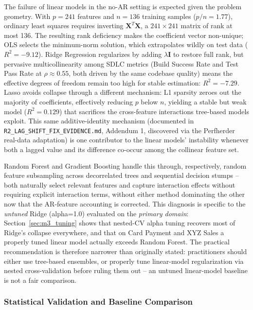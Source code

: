 \documentclass[technologies,article,submit,pdftex,moreauthors]{Definitions/mdpi}
\begin{document}
The failure of linear models in the no-AR setting is expected given the
problem geometry. With \(p = 241\) features and \(n = 136\) training
samples (\(p/n = 1.77\)), ordinary least squares requires inverting
\(\mathbf{X}^T\mathbf{X}\), a \(241 \times 241\) matrix of rank at most
136. The resulting rank deficiency makes the coefficient vector
non-unique; OLS selects the minimum-norm solution, which extrapolates
wildly on test data (\(R^2 = -9.12\)). Ridge Regression regularizes by
adding \(\lambda \mathbf{I}\) to restore full rank, but pervasive
multicollinearity among SDLC metrics (Build Success Rate and Test Pass
Rate at \(\rho \approx 0.55\), both driven by the same codebase quality)
means the effective degrees of freedom remain too high for stable
estimation: \(R^2 = -7.29\). Lasso avoids collapse through a different
mechanism: L1 sparsity zeroes out the majority of coefficients,
effectively reducing \(p\) below \(n\), yielding a stable but weak model
(\(R^2 = 0.129\)) that sacrifices the cross-feature interactions
tree-based models exploit. This same additive-identity mechanism
(documented in \texttt{R2\_\allowbreak LAG\_\allowbreak SHIFT\_\allowbreak FIX\_\allowbreak EVIDENCE.md}, Addendum 1,
discovered via the Perfherder real-data adaptation) is one contributor
to the linear models' instability whenever both a lagged value and its
difference co-occur among the collinear feature set.

Random Forest and Gradient Boosting handle this through, respectively,
random feature subsampling across decorrelated trees and sequential
decision stumps -- both naturally select relevant features and capture
interaction effects without requiring explicit interaction terms,
without either method dominating the other now that the AR-feature
accounting is corrected. This diagnosis is specific to the
\emph{untuned} Ridge (alpha=1.0) evaluated on the \emph{primary domain}:
Section~\ref{sec:m3_tuning} shows that nested-CV alpha tuning recovers most of Ridge's
collapse everywhere, and that on Card Payment and XYZ Sales a properly
tuned linear model actually exceeds Random Forest. The practical
recommendation is therefore narrower than originally stated:
practitioners should either use tree-based ensembles, or properly tune
linear-model regularization via nested cross-validation before ruling
them out -- an untuned linear-model baseline is not a fair comparison.

\subsubsection{Statistical Validation and Baseline
Comparison}\label{sec:statistical_validation}
\end{document}
